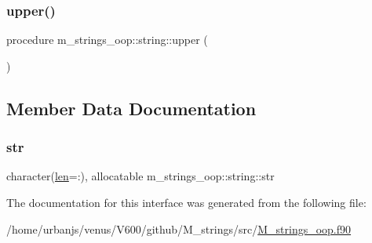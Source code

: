 \mbox{\label{structm__strings__oop_1_1string_ac4852f9fcb37135cfb6d368cc6cef2fe}} 
\subsubsection{\texorpdfstring{upper()}{upper()}}
{\footnotesize\ttfamily procedure m\+\_\+strings\+\_\+oop\+::string\+::upper (\begin{DoxyParamCaption}{ }\end{DoxyParamCaption})\hspace{0.3cm}{\ttfamily [private]}}



\subsection{Member Data Documentation}
\mbox{\label{structm__strings__oop_1_1string_a52469ac69ef806468520b42894ca5e77}} 
\subsubsection{\texorpdfstring{str}{str}}
{\footnotesize\ttfamily character(\mbox{\hyperlink{structm__strings__oop_1_1string_acd9093a5a0ca686837cce1908846ae53}{len}}=\+:), allocatable m\+\_\+strings\+\_\+oop\+::string\+::str\hspace{0.3cm}{\ttfamily [private]}}



The documentation for this interface was generated from the following file\+:\begin{DoxyCompactItemize}
\item 
/home/urbanjs/venus/\+V600/github/\+M\+\_\+strings/src/\mbox{\hyperlink{M__strings__oop_8f90}{M\+\_\+strings\+\_\+oop.\+f90}}\end{DoxyCompactItemize}
